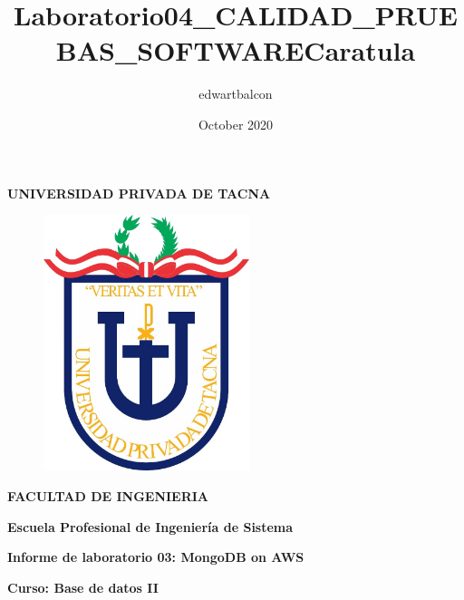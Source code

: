 \documentclass{article}
\title{Laboratorio04_CALIDAD_PRUEBAS_SOFTWARE}
\author{edwartbalcon }
\date{October 2020}
\begin{document}
\title{Caratula}

\begin{titlepage}
\begin{center}
\begin{Large}
\textbf{UNIVERSIDAD PRIVADA DE TACNA} \\
\end{Large}
\vspace*{-0.025in}
\begin{figure}[htb]
\begin{center}
\includegraphics[width=6cm]{./images/logo_UPT}
\end{center}
\end{figure}
\vspace*{-0.025in}
\begin{Large}
\textbf{FACULTAD DE INGENIERIA} \\
\end{Large}
\vspace*{0.05in}
\begin{Large}
\textbf{Escuela Profesional de Ingeniería de Sistema} \\
\end{Large}


\vspace*{0.4in}

\vspace*{0.1in}
\begin{Large}
\textbf{Informe de laboratorio 03: MongoDB on AWS} \\
\end{Large}

\vspace*{0.3in}
\begin{Large}
\textbf{Curso: Base de datos II} \\
\end{Large}


\end{center}
\end{titlepage}
\end{document}

